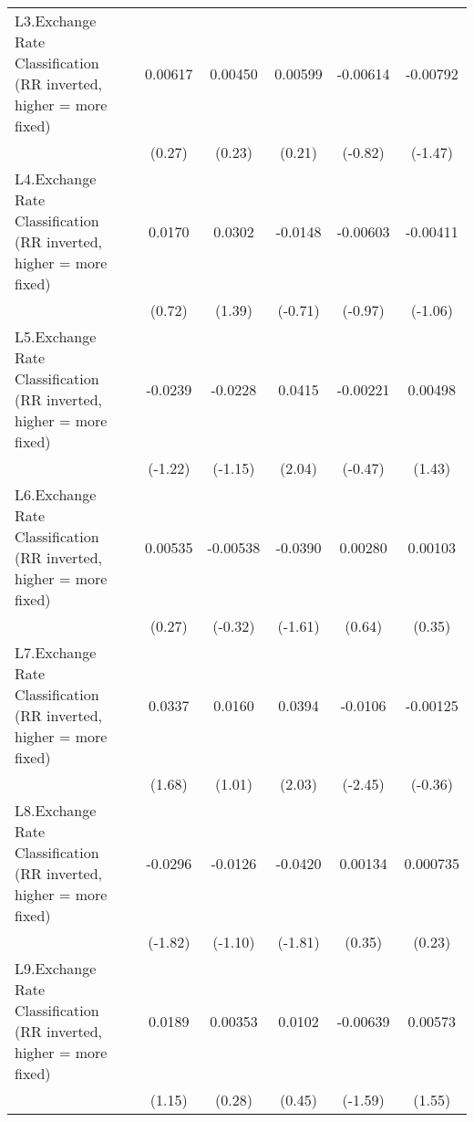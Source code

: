 {\begin{longtable}{l*{5}{c}}
\addlinespace
L3.Exchange Rate Classification (RR inverted, higher = more fixed)&  0.00617         &  0.00450         &  0.00599         & -0.00614         & -0.00792         \\
                &   (0.27)         &   (0.23)         &   (0.21)         &  (-0.82)         &  (-1.47)         \\
\addlinespace
L4.Exchange Rate Classification (RR inverted, higher = more fixed)&   0.0170         &   0.0302         &  -0.0148         & -0.00603         & -0.00411         \\
                &   (0.72)         &   (1.39)         &  (-0.71)         &  (-0.97)         &  (-1.06)         \\
\addlinespace
L5.Exchange Rate Classification (RR inverted, higher = more fixed)&  -0.0239         &  -0.0228         &   0.0415\sym{*}  & -0.00221         &  0.00498         \\
                &  (-1.22)         &  (-1.15)         &   (2.04)         &  (-0.47)         &   (1.43)         \\
\addlinespace
L6.Exchange Rate Classification (RR inverted, higher = more fixed)&  0.00535         & -0.00538         &  -0.0390         &  0.00280         &  0.00103         \\
                &   (0.27)         &  (-0.32)         &  (-1.61)         &   (0.64)         &   (0.35)         \\
\addlinespace
L7.Exchange Rate Classification (RR inverted, higher = more fixed)&   0.0337         &   0.0160         &   0.0394\sym{*}  &  -0.0106\sym{*}  & -0.00125         \\
                &   (1.68)         &   (1.01)         &   (2.03)         &  (-2.45)         &  (-0.36)         \\
\addlinespace
L8.Exchange Rate Classification (RR inverted, higher = more fixed)&  -0.0296         &  -0.0126         &  -0.0420         &  0.00134         & 0.000735         \\
                &  (-1.82)         &  (-1.10)         &  (-1.81)         &   (0.35)         &   (0.23)         \\
\addlinespace
L9.Exchange Rate Classification (RR inverted, higher = more fixed)&   0.0189         &  0.00353         &   0.0102         & -0.00639         &  0.00573         \\
                &   (1.15)         &   (0.28)         &   (0.45)         &  (-1.59)         &   (1.55)         \\

\end{longtable}}
